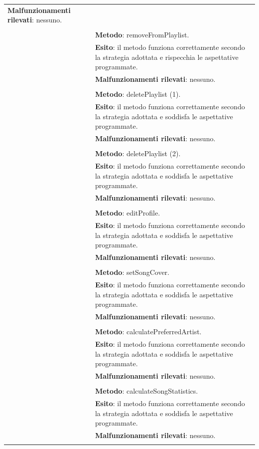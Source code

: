 \begin{footnotesize}
\begin{longtable}{|p{5.7cm}|p{10.3cm}|}
  \textbf{Malfunzionamenti rilevati}: nessuno.\\&
  \\&
  \textbf{Metodo}: removeFromPlaylist.\\&
  \textbf{Esito}: il metodo funziona correttamente secondo la strategia
  adottata e rispecchia le aspettative programmate.\\&
  \textbf{Malfunzionamenti rilevati}: nessuno.\\&
  \\&
  \textbf{Metodo}: deletePlaylist (1).\\&
  \textbf{Esito}: il metodo funziona correttamente secondo la strategia
  adottata e soddisfa le aspettative programmate.\\&
  \textbf{Malfunzionamenti rilevati}: nessuno.\\&
  \\&
  \textbf{Metodo}: deletePlaylist (2).\\&
  \textbf{Esito}: il metodo funziona correttamente secondo la strategia
  adottata e soddisfa le aspettative programmate.\\&
  \textbf{Malfunzionamenti rilevati}: nessuno.\\&
  \\&
  \textbf{Metodo}: editProfile.\\&
  \textbf{Esito}: il metodo funziona correttamente secondo la strategia
  adottata e soddisfa le aspettative programmate.\\&
  \textbf{Malfunzionamenti rilevati}: nessuno.\\&
  \\&
  \textbf{Metodo}: setSongCover.\\&
  \textbf{Esito}: il metodo funziona correttamente secondo la strategia
  adottata e soddisfa le aspettative programmate.\\&
  \textbf{Malfunzionamenti rilevati}: nessuno.\\&
  \\&
  \textbf{Metodo}: calculatePreferredArtist.\\&
  \textbf{Esito}: il metodo funziona correttamente secondo la strategia
  adottata e soddisfa le aspettative programmate.\\&
  \textbf{Malfunzionamenti rilevati}: nessuno.\\&
  \\&
  \textbf{Metodo}: calculateSongStatistics.\\&
  \textbf{Esito}: il metodo funziona correttamente secondo la strategia
  adottata e soddisfa le aspettative programmate.\\&
  \textbf{Malfunzionamenti rilevati}: nessuno.\\&
  \\
  

\end{longtable}
\end{footnotesize}
